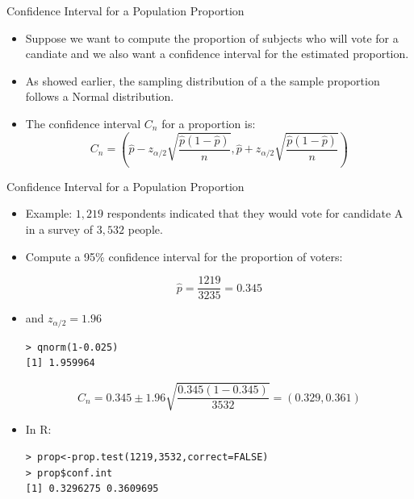 \documentclass[handout]{beamer}
\begin{document}
\begin{frame}{Confidence Interval for a Population Proportion}
\scriptsize{
\begin{itemize}
 \item Suppose we want to compute the proportion of subjects who will vote for a candiate and we also want a confidence interval for the estimated proportion.
 
 \item As showed earlier, the sampling distribution of a the sample proportion follows a Normal distribution.

 \item The confidence interval $C_n$ for a proportion is:
\begin{displaymath}
 C_n = \left(\hat{p}-z_{\alpha/2}\sqrt{\frac{\hat{p}(1-\hat p)}{n}} , \hat{p} + z_{\alpha/2}\sqrt{\frac{\hat{p}(1-\hat p)}{n}}\right) 
 \end{displaymath} 



\end{itemize}

}

 
\end{frame}


\begin{frame}[fragile]{Confidence Interval for a Population Proportion}
\scriptsize{
\begin{itemize}
\item Example: $1,219$ respondents indicated that they would vote for candidate A in a survey of $3,532$ people. 

\item Compute a 95\% confidence interval for the proportion of voters: 
 
\begin{displaymath}
 \hat{p}=\frac{1219}{3235}=0.345
\end{displaymath}

\item and $z_{\alpha/2}=1.96$ 
\begin{verbatim}
> qnorm(1-0.025)
[1] 1.959964
\end{verbatim}

\begin{displaymath}
 C_n = 0.345 \pm 1.96\sqrt{\frac{0.345(1-0.345)}{3532}} = (0.329,0.361)  
 \end{displaymath} 
 
\item In R:
 
\begin{verbatim}
> prop<-prop.test(1219,3532,correct=FALSE)
> prop$conf.int
[1] 0.3296275 0.3609695
\end{verbatim}



\end{itemize}

}

 
\end{frame}
\end{document}
